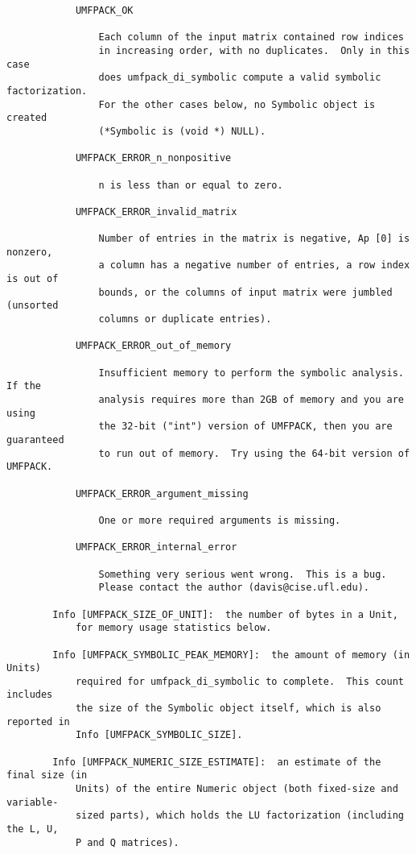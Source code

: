 \documentclass[11pt]{article}
\begin{document}
{\begin{verbatim}
            UMFPACK_OK

                Each column of the input matrix contained row indices
                in increasing order, with no duplicates.  Only in this case
                does umfpack_di_symbolic compute a valid symbolic factorization.
                For the other cases below, no Symbolic object is created
                (*Symbolic is (void *) NULL).

            UMFPACK_ERROR_n_nonpositive

                n is less than or equal to zero.

            UMFPACK_ERROR_invalid_matrix

                Number of entries in the matrix is negative, Ap [0] is nonzero,
                a column has a negative number of entries, a row index is out of
                bounds, or the columns of input matrix were jumbled (unsorted
                columns or duplicate entries).

            UMFPACK_ERROR_out_of_memory

                Insufficient memory to perform the symbolic analysis.  If the
                analysis requires more than 2GB of memory and you are using
                the 32-bit ("int") version of UMFPACK, then you are guaranteed
                to run out of memory.  Try using the 64-bit version of UMFPACK.

            UMFPACK_ERROR_argument_missing

                One or more required arguments is missing.

            UMFPACK_ERROR_internal_error

                Something very serious went wrong.  This is a bug.
                Please contact the author (davis@cise.ufl.edu).

        Info [UMFPACK_SIZE_OF_UNIT]:  the number of bytes in a Unit,
            for memory usage statistics below.

        Info [UMFPACK_SYMBOLIC_PEAK_MEMORY]:  the amount of memory (in Units)
            required for umfpack_di_symbolic to complete.  This count includes
            the size of the Symbolic object itself, which is also reported in
            Info [UMFPACK_SYMBOLIC_SIZE].

        Info [UMFPACK_NUMERIC_SIZE_ESTIMATE]:  an estimate of the final size (in
            Units) of the entire Numeric object (both fixed-size and variable-
            sized parts), which holds the LU factorization (including the L, U,
            P and Q matrices).


\end{verbatim}}
\end{document}
